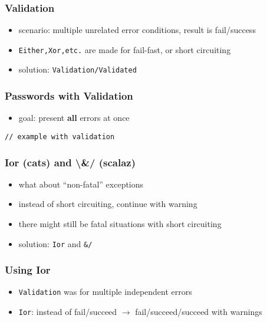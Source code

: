 \documentclass{beamer}
\begin{document}
\begin{frame}
  \frametitle{Validation}
  \begin{itemize}
  \item scenario: multiple unrelated error conditions, result is
    fail/success
  \item \texttt{Either,Xor,etc.} are made for fail-fast, or
    short circuiting
  \item solution: \texttt{Validation/Validated}
  \end{itemize}
\end{frame}

\begin{frame}[fragile]
  \frametitle{Passwords with Validation}
  \begin{itemize}
  \item goal: present \textbf{all} errors at once
  \end{itemize}
\begin{verbatim}
// example with validation
\end{verbatim}
\end{frame}

\begin{frame}
  \frametitle{Ior (cats) and \textbackslash{}\&/ (scalaz)}
  \begin{itemize}
  \item what about ``non-fatal'' exceptions
  \item instead of short circuiting, continue with warning
  \item there might still be fatal situations with short circuiting
  \item solution: \texttt{Ior} and \texttt{\&/}
  \end{itemize}
\end{frame}

\begin{frame}
  \frametitle{Using Ior}
  \begin{itemize}
  \item \texttt{Validation} was for multiple independent errors
  \item \texttt{Ior}: instead of fail/succeed $\rightarrow$ fail/succeed/succeed with warnings
  \end{itemize}
\end{frame}
\end{document}
